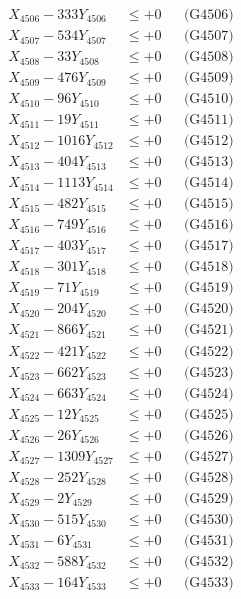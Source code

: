 \documentclass[a4paper,10pt]{article}
\begin{document}
{\begin{align}
X_{4506} - 333Y_{4506} &\leq +0 && \text{(G4506)} \\
X_{4507} - 534Y_{4507} &\leq +0 && \text{(G4507)} \\
X_{4508} - 33Y_{4508} &\leq +0 && \text{(G4508)} \\
X_{4509} - 476Y_{4509} &\leq +0 && \text{(G4509)} \\
X_{4510} - 96Y_{4510} &\leq +0 && \text{(G4510)} \\
\allowbreak
X_{4511} - 19Y_{4511} &\leq +0 && \text{(G4511)} \\
X_{4512} - 1016Y_{4512} &\leq +0 && \text{(G4512)} \\
X_{4513} - 404Y_{4513} &\leq +0 && \text{(G4513)} \\
X_{4514} - 1113Y_{4514} &\leq +0 && \text{(G4514)} \\
X_{4515} - 482Y_{4515} &\leq +0 && \text{(G4515)} \\
X_{4516} - 749Y_{4516} &\leq +0 && \text{(G4516)} \\
X_{4517} - 403Y_{4517} &\leq +0 && \text{(G4517)} \\
X_{4518} - 301Y_{4518} &\leq +0 && \text{(G4518)} \\
X_{4519} - 71Y_{4519} &\leq +0 && \text{(G4519)} \\
X_{4520} - 204Y_{4520} &\leq +0 && \text{(G4520)} \\
\allowbreak
X_{4521} - 866Y_{4521} &\leq +0 && \text{(G4521)} \\
X_{4522} - 421Y_{4522} &\leq +0 && \text{(G4522)} \\
X_{4523} - 662Y_{4523} &\leq +0 && \text{(G4523)} \\
X_{4524} - 663Y_{4524} &\leq +0 && \text{(G4524)} \\
X_{4525} - 12Y_{4525} &\leq +0 && \text{(G4525)} \\
X_{4526} - 26Y_{4526} &\leq +0 && \text{(G4526)} \\
X_{4527} - 1309Y_{4527} &\leq +0 && \text{(G4527)} \\
X_{4528} - 252Y_{4528} &\leq +0 && \text{(G4528)} \\
X_{4529} - 2Y_{4529} &\leq +0 && \text{(G4529)} \\
X_{4530} - 515Y_{4530} &\leq +0 && \text{(G4530)} \\
\allowbreak
X_{4531} - 6Y_{4531} &\leq +0 && \text{(G4531)} \\
X_{4532} - 588Y_{4532} &\leq +0 && \text{(G4532)} \\
X_{4533} - 164Y_{4533} &\leq +0 && \text{(G4533)} \\

\end{align}}
\end{document}
